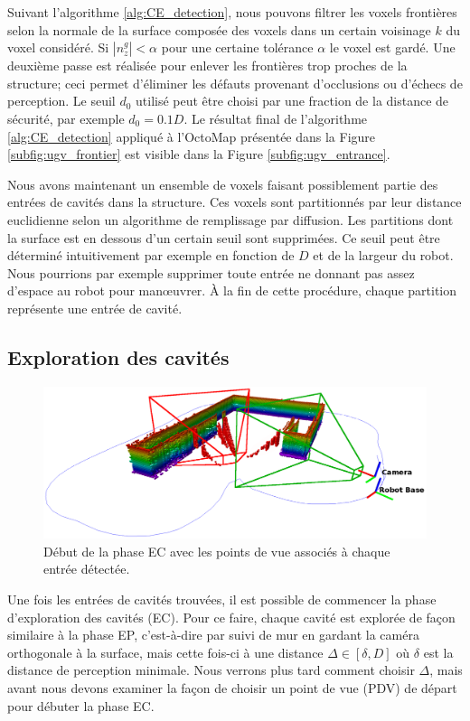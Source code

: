 Suivant l'algorithme \ref{alg:CE_detection}, nous pouvons filtrer les voxels frontières selon la normale de la surface composée des voxels dans un certain voisinage $k$ du voxel considéré. Si $| n_z^g | < \alpha$ pour une certaine tolérance $\alpha$ le voxel est gardé. Une deuxième passe est réalisée pour enlever les frontières trop proches de la structure; ceci permet d'éliminer les défauts provenant d'occlusions ou d'échecs de perception. Le seuil $d_0$ utilisé peut être choisi par une fraction de la distance de sécurité, par exemple $d_0 = 0.1D$. Le résultat final de l'algorithme \ref{alg:CE_detection} appliqué à l'OctoMap présentée dans la Figure \ref{subfig:ugv_frontier} est visible dans la Figure \ref{subfig:ugv_entrance}.

Nous avons maintenant un ensemble de voxels faisant possiblement partie des entrées de cavités dans la structure. Ces voxels sont partitionnés par leur distance euclidienne selon un algorithme de remplissage par diffusion. Les partitions dont la surface est en dessous d'un certain seuil sont supprimées. Ce seuil peut être déterminé intuitivement par exemple en fonction de $D$ et de la largeur du robot. Nous pourrions par exemple supprimer toute entrée ne donnant pas assez d'espace au robot pour man{\oe}uvrer. À la fin de cette procédure, chaque partition représente une entrée de cavité.

\subsection{Exploration des cavités}

\begin{figure}[ht]
  \centering
  \includegraphics[width=0.8\linewidth]{images/CE_start}
  \caption{Début de la phase EC avec les points de vue associés à chaque entrée détectée.}
  \label{ugv:debut_ec}
\end{figure}

Une fois les entrées de cavités trouvées, il est possible de commencer la phase d'exploration des cavités (EC). Pour ce faire, chaque cavité est explorée de façon similaire à la phase EP, c'est-à-dire par suivi de mur en gardant la caméra orthogonale à la surface, mais cette fois-ci à une distance $\Delta \in [\delta, D]$ où $\delta$ est la distance de perception minimale. Nous verrons plus tard comment choisir $\Delta$, mais avant nous devons examiner la façon de choisir un point de vue (PDV) de départ pour débuter la phase EC.

